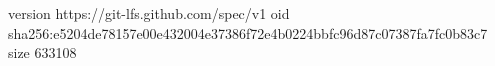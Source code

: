 version https://git-lfs.github.com/spec/v1
oid sha256:e5204de78157e00e432004e37386f72e4b0224bbfc96d87c07387fa7fc0b83c7
size 633108
